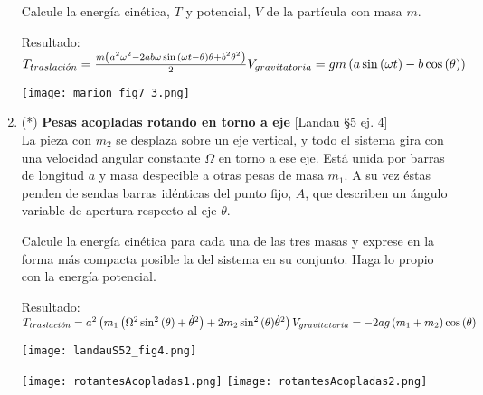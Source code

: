 \documentclass[11pt, spanish, a4paper, twoside]{article}
\begin{document}
\begin{enumerate}
\begin{minipage}[t][7.1cm]{0.55\textwidth}
		Calcule la energía cinética, \(T\) y potencial, \(V\) de la partícula con masa \(m\).

		Resultado:\\
		\(
			T_{traslaci\acute{o}n} = \frac{m \left(a^{2} \omega^{2} - 2 a b \omega \sin{\left(\omega t - \theta \right)} \dot{\theta} + b^{2} \dot{\theta}^{2}\right)}{2}\\
			V_{gravitatoria} = g m \left(a \sin{\left(\omega t \right)} - b \cos{\left(\theta \right)}\right)
		\)
	\end{minipage}
	\begin{minipage}[c][3cm][t]{0.5\textwidth}
		\texttt{[image: marion\_fig7\_3.png]}
	\end{minipage}



\item
	\begin{minipage}[t][7cm]{0.65\textwidth}
		(*) \textbf{Pesas acopladas rotando en torno a eje} [Landau \S5 ej. 4]\\

		La pieza con \(m_2\) se desplaza sobre un eje vertical, y todo el sistema gira con una velocidad angular constante \(\Omega\) en torno a ese eje.
		Está unida por barras de longitud \(a\) y masa despecible a otras pesas de masa \(m_1\).
		A su vez éstas penden de sendas barras idénticas del punto fijo, \(A\), que describen un ángulo variable de apertura respecto al eje \(\theta\).

		Calcule la energía cinética para cada una de las tres masas y exprese en la forma más compacta posible la del sistema en su conjunto.
		Haga lo propio con la energía potencial.

		Resultado:\\
		\(
			T_{traslaci\acute{o}n} = a^{2} \left( m_{1} \left( \Omega^{2} \sin^{2}{\left(\theta \right)} + \dot{\theta}^{2}\right) + 2 m_{2} \sin^{2}{\left(\theta \right)} \dot{\theta}^{2} \right) \\
			V_{gravitatoria} = - 2 a g \left(m_{1} + m_{2}\right) \cos{\left(\theta \right)}
		\)
	\end{minipage}
	\begin{minipage}[c][1cm][t]{0.35\textwidth}
		\texttt{[image: landauS52\_fig4.png]}
	\end{minipage}

	\begin{center}
		\texttt{[image: rotantesAcopladas1.png]}
		\texttt{[image: rotantesAcopladas2.png]}
	\end{center}


\end{enumerate}
\end{document}
